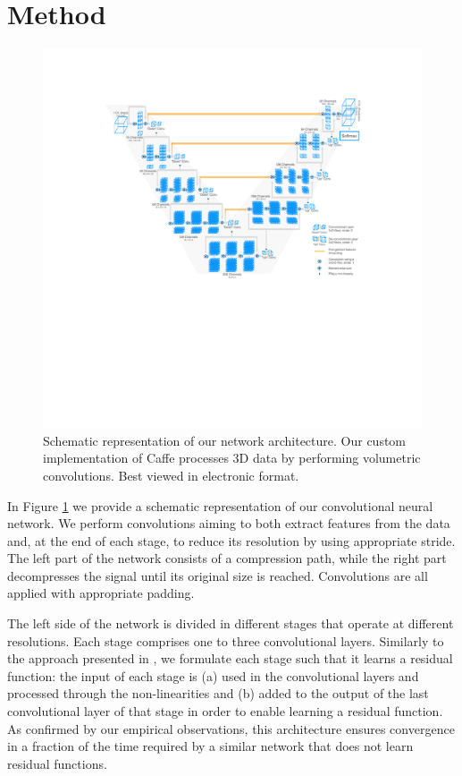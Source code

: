 
\section{Method}
\label{sec:method}

\begin{figure} 	
\centering 	
\includegraphics[scale=0.26]{architecture.pdf} 	
\caption{Schematic representation of our network architecture. Our custom implementation of Caffe \cite{jia2014caffe} processes 3D data by performing volumetric convolutions. Best viewed in electronic format.} \label{fig:VnetImage} 
\end{figure}

In Figure \ref{fig:VnetImage} we provide a schematic representation of our convolutional neural network. 
We perform convolutions aiming to both extract features from the data and, at the end of each stage, to reduce its resolution by using appropriate stride. The left part of the network consists of a compression path, while the right part decompresses the signal until its original size is reached. Convolutions are all applied with appropriate padding.

The left side of the network is divided in different stages that operate at different resolutions. Each stage comprises one to three convolutional layers. Similarly to the approach presented in \cite{he2015deep}, we formulate each stage such that it learns a residual function: the input of each stage is (a) used in the convolutional layers and processed through the non-linearities and (b) added to the output of the last convolutional layer of that stage in order to enable learning a residual function. As confirmed by our empirical observations, this architecture ensures convergence in a fraction of the time required by a similar network that does not learn residual functions. 

